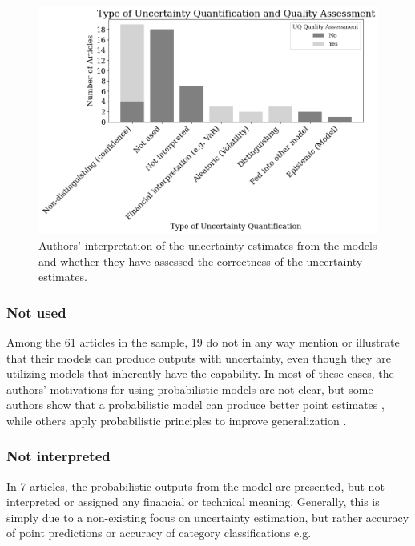 \begin{figure}[H]
    \centering
    \includegraphics[width=1\linewidth]{Images/uncertainty_quantification_by_type_and_assessment.png}
    \caption{Authors' interpretation of the uncertainty estimates from the models and whether they have assessed the correctness of the uncertainty estimates.}
    \label{fig:uncertainty_quantification_by_type_and_assessment}
\end{figure}


\subsubsection{Not used}

Among the 61 articles in the sample, 19 do not in any way mention or illustrate that their models can produce outputs with uncertainty, even though they are utilizing models that inherently have the capability. In most of these cases, the authors' motivations for using probabilistic models are not clear, but some authors show that a probabilistic model can produce better point estimates \parencite{Daniali2021, Papaioannou2022gpr, Park2014gpr}, while others apply probabilistic principles to improve generalization \textcite{jang2018generative}.

\subsubsection{Not interpreted}

In 7 articles, the probabilistic outputs from the model are presented, but not interpreted or assigned any financial or technical meaning. Generally, this is simply due to a non-existing focus on uncertainty estimation, but rather accuracy of point predictions \parencite{DeSpiegeleer2018gpr} or accuracy of category classifications e.g. \parencite{Malagrino2018Forecasting, Zhang2016}


